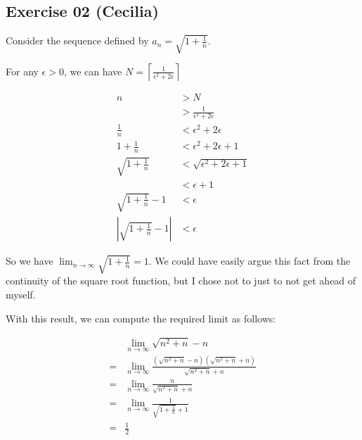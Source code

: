 \subsection*{Exercise 02 (Cecilia)}
Consider the sequence defined by $ a_n = \sqrt{1 + \frac{1}{n}} $.

For any $ \epsilon > 0 $, we can have $ N = \left\lceil \frac{1}{\epsilon^2 + 2\epsilon} \right\rceil $ 

\begin{align*}
                                         n &> N                                 \\
                                           &> \frac{1}{\epsilon^2 + 2\epsilon}  \\
                               \frac{1}{n} &< \epsilon^2 + 2\epsilon            \\
                           1 + \frac{1}{n} &< \epsilon^2 + 2\epsilon + 1        \\
                    \sqrt{1 + \frac{1}{n}} &< \sqrt{\epsilon^2 + 2\epsilon + 1} \\
                                           &< \epsilon + 1                      \\
                \sqrt{1 + \frac{1}{n}} - 1 &< \epsilon                          \\
  \left|\sqrt{1 + \frac{1}{n}} - 1 \right| &< \epsilon
\end{align*}

So we have $ \lim_{n \to \infty} \sqrt{1 + \frac{1}{n}} = 1 $. We could have easily argue this fact from the continuity of the square root function, but I chose not to just to not get ahead of myself.

With this result, we can compute the required limit as follows:

\begin{align*}
    & \lim_{n \to \infty} \sqrt{n^2 + n} - n \\
   =& \lim_{n \to \infty} \frac{(\sqrt{n^2 + n} - n)(\sqrt{n^2 + n} + n)}{\sqrt{n^2 + n} + n} \\
   =& \lim_{n \to \infty} \frac{n}{\sqrt{n^2 + n} + n} \\
   =& \lim_{n \to \infty} \frac{1}{\sqrt{1 + \frac{1}{n}} + 1} \\
   =& \frac{1}{2}
\end{align*}